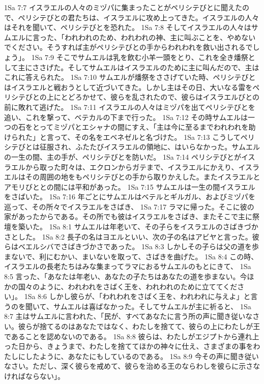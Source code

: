 1Sa 7:7  イスラエルの人々のミヅパに集まったことがペリシテびとに聞えたので、ペリシテびとの君たちは、イスラエルに攻め上ってきた。イスラエルの人々はそれを聞いて、ペリシテびとを恐れた。
1Sa 7:8  そしてイスラエルの人々はサムエルに言った、「われわれのため、われわれの神、主に叫ぶことを、やめないでください。そうすれば主がペリシテびとの手からわれわれを救い出されるでしょう」。
1Sa 7:9  そこでサムエルは乳を飲む小羊一頭をとり、これを全き燔祭として主にささげた。そしてサムエルはイスラエルのために主に叫んだので、主はこれに答えられた。
1Sa 7:10  サムエルが燔祭をささげていた時、ペリシテびとはイスラエルと戦おうとして近づいてきた。しかし主はその日、大いなる雷をペリシテびとの上にとどろかせて、彼らを乱されたので、彼らはイスラエルびとの前に敗れて逃げた。
1Sa 7:11  イスラエルの人々はミヅパを出てペリシテびとを追い、これを撃って、ベテカルの下まで行った。
1Sa 7:12  その時サムエルは一つの石をとってミヅパとエシャナの間にすえ、「主は今に至るまでわれわれを助けられた」と言って、その名をエベネゼルと名づけた。
1Sa 7:13  こうしてペリシテびとは征服され、ふたたびイスラエルの領地に、はいらなかった。サムエルの一生の間、主の手が、ペリシテびとを防いだ。
1Sa 7:14  ペリシテびとがイスラエルから取った町々は、エクロンからガテまで、イスラエルにかえり、イスラエルはその周囲の地をもペリシテびとの手から取りかえした。またイスラエルとアモリびととの間には平和があった。
1Sa 7:15  サムエルは一生の間イスラエルをさばいた。
1Sa 7:16  年ごとにサムエルはベテルとギルガル、およびミヅパを巡って、その所々でイスラエルをさばき、
1Sa 7:17  ラマに帰った。そこに彼の家があったからである。その所でも彼はイスラエルをさばき、またそこで主に祭壇を築いた。
1Sa 8:1  サムエルは年老いて、その子らをイスラエルのさばきづかさとした。
1Sa 8:2  長子の名はヨエルといい、次の子の名はアビヤと言った。彼らはベエルシバでさばきづかさであった。
1Sa 8:3  しかしその子らは父の道を歩まないで、利にむかい、まいないを取って、さばきを曲げた。
1Sa 8:4  この時、イスラエルの長老たちはみな集まってラマにおるサムエルのもとにきて、
1Sa 8:5  言った、「あなたは年老い、あなたの子たちはあなたの道を歩まない。今ほかの国々のように、われわれをさばく王を、われわれのために立ててください」。
1Sa 8:6  しかし彼らが、「われわれをさばく王を、われわれに与えよ」と言うのを聞いて、サムエルは喜ばなかった。そしてサムエルが主に祈ると、
1Sa 8:7  主はサムエルに言われた、「民が、すべてあなたに言う所の声に聞き従いなさい。彼らが捨てるのはあなたではなく、わたしを捨てて、彼らの上にわたしが王であることを認めないのである。
1Sa 8:8  彼らは、わたしがエジプトから連れ上った日から、きょうまで、わたしを捨ててほかの神々に仕え、さまざまの事をわたしにしたように、あなたにもしているのである。
1Sa 8:9  今その声に聞き従いなさい。ただし、深く彼らを戒めて、彼らを治める王のならわしを彼らに示さなければならない」。
